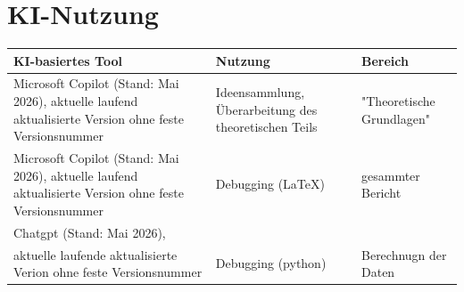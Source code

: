 \chapter{KI-Nutzung}


\begin{table}[h!]
\centering
\begin{tabular}{|p{5cm}|p{3cm}|p{3cm}|}
\hline
\textbf{KI-basiertes Tool} & \textbf{Nutzung} & \textbf{Bereich} \\
\hline
Microsoft Copilot (Stand: Mai 2026), aktuelle laufend aktualisierte Version ohne feste Versionsnummer 
& Ideensammlung, Überarbeitung des theoretischen Teils 
& "Theoretische Grundlagen" \\
\hline
Microsoft Copilot (Stand: Mai 2026), aktuelle laufend aktualisierte Version ohne feste Versionsnummer 
& Debugging (LaTeX) & gesammter Bericht \\
\hline
Chatgpt (Stand: Mai 2026),\\
aktuelle laufende aktualisierte Verion ohne feste Versionsnummer&Debugging (python) & Berechnugn der Daten\\
\hline
\end{tabular}
\end{table}
